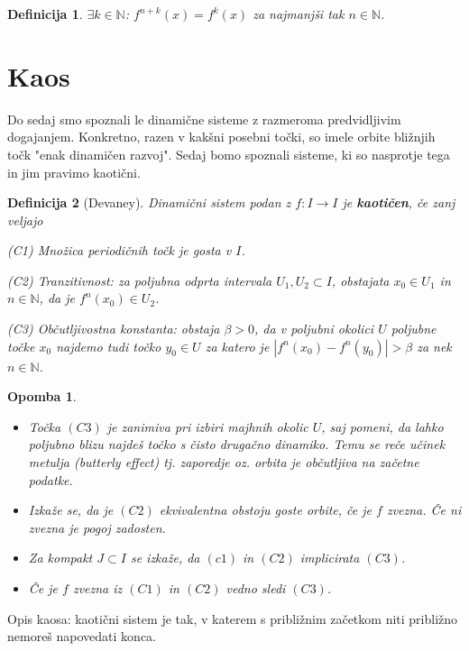 \documentclass{article}
\newtheorem{definicija}{Definicija}
\newtheorem{opomba}{Opomba}
\newcommand{\N}{\mathbb{N}}
\begin{document}
\begin{definicija}
$\exists k\in \N$: $f^{n+k}(x) = f^k(x)$ za  najmanjši tak $n\in \N$.
\end{definicija}

\section{Kaos}
Do sedaj smo spoznali le dinamične sisteme z razmeroma predvidljivim dogajanjem. Konkretno, razen v kakšni posebni točki, so imele orbite bližnjih točk "enak dinamičen razvoj". Sedaj bomo spoznali sisteme, ki so nasprotje tega in jim pravimo kaotični. 

\begin{definicija}[Devaney]
Dinamični sistem podan z $f:I \rightarrow I$ je \textbf{kaotičen}, če zanj veljajo
\item[(C1)] Množica periodičnih točk je gosta v $I$.
\item[(C2)] Tranzitivnost: za poljubna odprta intervala $U_1, U_2 \subset I$, obstajata $x_0\in U_1$ in $n\in \N$, da je $f^n(x_0) \in U_2$.
\item[(C3)] Občutljivostna konstanta: obstaja $\beta > 0$, da v poljubni okolici $U$ poljubne točke $x_0$ najdemo tudi točko $y_0 \in U$ za katero je $|f^n(x_0) - f^n(y_0)| > \beta$ za nek $n\in \N$.
\end{definicija}

\begin{opomba}
\hfill 
\begin{itemize}
\item Točka $(C3)$ je zanimiva pri izbiri majhnih okolic $U$, saj pomeni, da lahko poljubno blizu najdeš točko s čisto drugačno dinamiko. Temu se reče učinek metulja (butterly effect) tj. zaporedje oz. orbita je občutljiva na začetne podatke.
\item Izkaže se, da je $(C2)$ ekvivalentna obstoju goste orbite, če je $f$ zvezna. Če ni zvezna je pogoj zadosten.
\item Za kompakt $J \subset I$ se izkaže, da $(c1)$ in $(C2)$ implicirata $(C3)$.
\item Če je $f$ zvezna iz $(C1)$ in $(C2)$ vedno sledi $(C3)$.
\end{itemize}
\end{opomba}
\noindent
Opis kaosa: kaotični sistem je tak, v katerem s približnim začetkom niti približno nemoreš napovedati konca.
\end{document}
